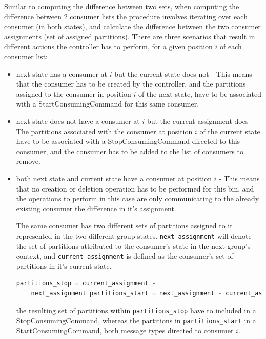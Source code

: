 Similar to computing the difference between two sets, when computing the
difference between 2 consumer lists the procedure involves iterating over each
consumer (in both states), and calculate the difference between the two consumer
assignments (set of assigned partitions). There are three scenarios that result
in different actions the controller has to perform, for a given position $i$ of
each consumer list: \begin{itemize} \item next state has a consumer at $i$ but
            the current state does not - This means that the consumer has to be
            created by the controller, and the partitions assigned to the
            consumer in position $i$ of the next state, have to be associated
            with a StartConsumingCommand for this same consumer.  \item next
                state does not have a consumer at $i$ but the current assignment
                does - The partitions associated with the consumer at position
                $i$ of the current state have to be associated with a
                StopConsumingCommand directed to this consumer, and the consumer
                has to be added to the list of consumers to remove.  \item both
                    next state and current state have a consumer at position $i$
                    - This means that no creation or deletion operation has to
                    be performed for this bin, and the operations to perform in
                    this case are only communicating to the already existing
                    consumer the difference in it's assignment. 
    
    The same consumer has two different sets of partitions assigned to it
        represented in the two different group states.
        \lstinline[language=Python]{next_assignment} will denote the set of
        partitions attributed to the consumer's state in the next group's
        context, and \lstinline[language=Python]{current_assignment} is defined
        as the consumer's set of partitions in it's current state.
    
    \begin{lstlisting}[language=Python] partitions_stop = current_assignment -
    next_assignment partitions_start = next_assignment - current_assignment
    \end{lstlisting} the resulting set of partitions within
        \lstinline[language=Python]{partitions_stop} have to included in a
        StopConsumingCommand, whereas the partitions in
        \lstinline[language=Python]{partitions_start} in a
        StartConsumingCommand, both message types directed to consumer $i$.
\end{itemize}


